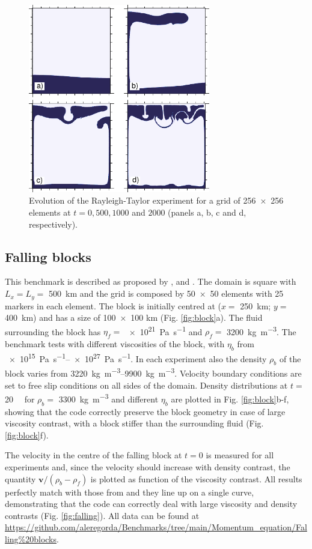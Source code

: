 \documentclass[hidelinks,10pt,a4paper]{article}
\begin{document}
\begin{figure}
\centering
\noindent\includegraphics[width=300px]{./Figures/Rayleigh.pdf}
\caption{Evolution of the Rayleigh-Taylor experiment for a grid of \num{256x256} elements at $t=0, 500, 1000$ and $2000$ (panels a, b, c and d, respectively).}
\label{fig:rayleigh}
\end{figure}

\subsection{Falling blocks}\label{sec:block}
This benchmark is described as proposed by \citet{Gerya2003a}, \citet{Gerya2010b} and \citet{Thieulot2011}. The domain is square with $L_x=L_y=$ \SI{500}{\km}
and the grid is composed by \num{50x50} elements with 25 markers in each element. The block is initially centred at ($x=$ \SI{250}{\km}; $y=$ \SI{400}{\km})
and has a size of \num{100x100} km (Fig. \ref{fig:block}a). The fluid surrounding the block has $\eta_f=$ \SI{e21}{\pascal\per\s} and $\rho_f=$
\SI{3200}{\kg\per\cubic\m}. The benchmark tests with different viscosities of the block, with $\eta_b$ from \SIrange{e15}{e27}{\pascal\per\s}. In each
experiment also the density $\rho_b$ of the block varies from \SIrange{3220}{9900}{\kg\per\cubic\m}. Velocity boundary conditions are set to free slip
conditions on all sides of the domain. Density distributions at $t=$ \SI{20}{\mega\year} for $\rho_b=$ \SI{3300}{\kg\per\cubic\m} and different $\eta_b$
are plotted in Fig. \ref{fig:block}b-f, showing that the code correctly preserve the block geometry in case of large viscosity contrast, with a block stiffer
than the surrounding fluid (Fig. \ref{fig:block}f).

The velocity in the centre of the falling block at $t=0$ is measured for all experiments and, since the velocity should increase with density contrast, the
quantity $\bm{v}/(\rho_b-\rho_f)$ is plotted as function of the viscosity contrast. All results perfectly match with those from \citet{Gerya2010b} and they
line up on a single curve, demonstrating that the code can correctly deal with large viscosity and density contrasts (Fig. \ref{fig:falling}). All data can be 
found at \url{https://github.com/aleregorda/Benchmarks/tree/main/Momentum_equation/Falling%20blocks}.
\end{document}
